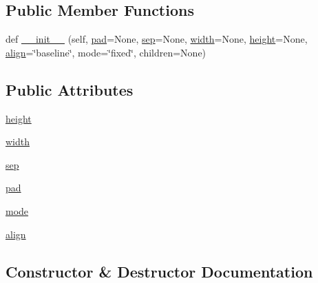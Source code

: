\subsection*{Public Member Functions}
\begin{DoxyCompactItemize}
\item 
def \hyperlink{classmatplotlib_1_1offsetbox_1_1PackerBase_a1558fae70b928b23e184e1e7b200b99c}{\+\_\+\+\_\+init\+\_\+\+\_\+} (self, \hyperlink{classmatplotlib_1_1offsetbox_1_1PackerBase_a14d2679fc7a924d127300a7159ef4a49}{pad}=None, \hyperlink{classmatplotlib_1_1offsetbox_1_1PackerBase_a1f9535c77f7bbd6551c5d89f50e726d4}{sep}=None, \hyperlink{classmatplotlib_1_1offsetbox_1_1PackerBase_aadd03b7d76a7b37fedf4de2019899dd0}{width}=None, \hyperlink{classmatplotlib_1_1offsetbox_1_1PackerBase_afe56db5f552efb848b9756f9aeb04e4e}{height}=None, \hyperlink{classmatplotlib_1_1offsetbox_1_1PackerBase_ab5473ea3854af65868c296303d798607}{align}=\char`\"{}baseline\char`\"{}, mode=\char`\"{}fixed\char`\"{}, children=None)
\end{DoxyCompactItemize}
\subsection*{Public Attributes}
\begin{DoxyCompactItemize}
\item 
\hyperlink{classmatplotlib_1_1offsetbox_1_1PackerBase_afe56db5f552efb848b9756f9aeb04e4e}{height}
\item 
\hyperlink{classmatplotlib_1_1offsetbox_1_1PackerBase_aadd03b7d76a7b37fedf4de2019899dd0}{width}
\item 
\hyperlink{classmatplotlib_1_1offsetbox_1_1PackerBase_a1f9535c77f7bbd6551c5d89f50e726d4}{sep}
\item 
\hyperlink{classmatplotlib_1_1offsetbox_1_1PackerBase_a14d2679fc7a924d127300a7159ef4a49}{pad}
\item 
\hyperlink{classmatplotlib_1_1offsetbox_1_1PackerBase_a03d68525c5aacb739fc6b1676ca5410e}{mode}
\item 
\hyperlink{classmatplotlib_1_1offsetbox_1_1PackerBase_ab5473ea3854af65868c296303d798607}{align}
\end{DoxyCompactItemize}


\subsection{Constructor \& Destructor Documentation}
\mbox{\label{classmatplotlib_1_1offsetbox_1_1PackerBase_a1558fae70b928b23e184e1e7b200b99c}} 
